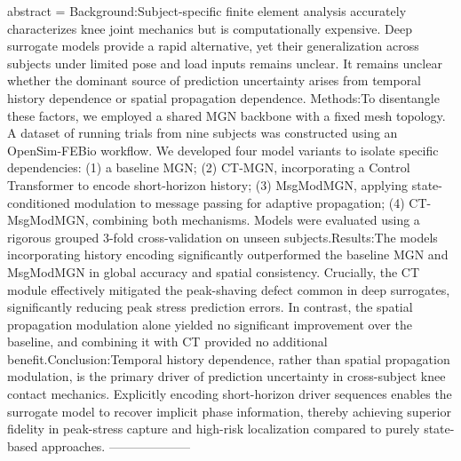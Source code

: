 {      abstract = {Background:Subject-specific finite element analysis accurately characterizes knee joint mechanics but is computationally expensive. Deep surrogate models provide a rapid alternative, yet their generalization across subjects under limited pose and load inputs remains unclear. It remains unclear whether the dominant source of prediction uncertainty arises from temporal history dependence or spatial propagation dependence. Methods:To disentangle these factors, we employed a shared MGN backbone with a fixed mesh topology. A dataset of running trials from nine subjects was constructed using an OpenSim-FEBio workflow. We developed four model variants to isolate specific dependencies: (1) a baseline MGN; (2) CT-MGN, incorporating a Control Transformer to encode short-horizon history; (3) MsgModMGN, applying state-conditioned modulation to message passing for adaptive propagation; (4) CT-MsgModMGN, combining both mechanisms. Models were evaluated using a rigorous grouped 3-fold cross-validation on unseen subjects.Results:The models incorporating history encoding significantly outperformed the baseline MGN and MsgModMGN in global accuracy and spatial consistency. Crucially, the CT module effectively mitigated the peak-shaving defect common in deep surrogates, significantly reducing peak stress prediction errors. In contrast, the spatial propagation modulation alone yielded no significant improvement over the baseline, and combining it with CT provided no additional benefit.Conclusion:Temporal history dependence, rather than spatial propagation modulation, is the primary driver of prediction uncertainty in cross-subject knee contact mechanics. Explicitly encoding short-horizon driver sequences enables the surrogate model to recover implicit phase information, thereby achieving superior fidelity in peak-stress capture and high-risk localization compared to purely state-based approaches.}
}
        --------------------
        
